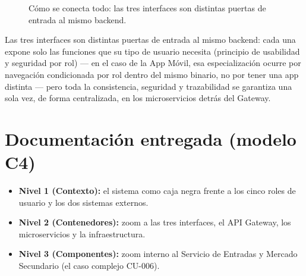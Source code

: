 \documentclass[12pt,a4paper]{article}
\begin{document}
\begin{figure}[H]
\centering
{}
\caption{Cómo se conecta todo: las tres interfaces son distintas puertas de entrada al mismo
backend.}
\end{figure}

Las tres interfaces son distintas puertas de entrada al mismo backend: cada una expone solo las
funciones que su tipo de usuario necesita (principio de usabilidad y seguridad por rol) --- en el
caso de la App Móvil, esa especialización ocurre por navegación condicionada por rol dentro del
mismo binario, no por tener una app distinta --- pero toda la consistencia, seguridad y
trazabilidad se garantiza una sola vez, de forma centralizada, en los microservicios detrás del
Gateway.

\section{Documentación entregada (modelo C4)}

\begin{itemize}
\item \textbf{Nivel 1 (Contexto):} el sistema como caja negra frente a los cinco roles de usuario
y los dos sistemas externos.
\item \textbf{Nivel 2 (Contenedores):} zoom a las tres interfaces, el API Gateway, los
microservicios y la infraestructura.
\item \textbf{Nivel 3 (Componentes):} zoom interno al Servicio de Entradas y Mercado Secundario
(el caso complejo CU-006).
\end{itemize}
\end{document}

